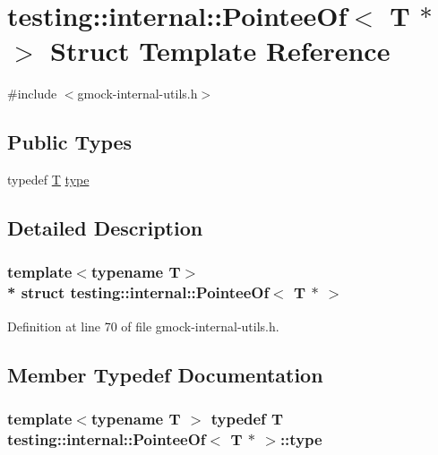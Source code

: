 \hypertarget{structtesting_1_1internal_1_1_pointee_of_3_01_t_01_5_01_4}{}\section{testing\+:\+:internal\+:\+:Pointee\+Of$<$ T $\ast$ $>$ Struct Template Reference}
\label{structtesting_1_1internal_1_1_pointee_of_3_01_t_01_5_01_4}


{\ttfamily \#include $<$gmock-\/internal-\/utils.\+h$>$}

\subsection*{Public Types}
\begin{DoxyCompactItemize}
\item 
typedef \hyperlink{functions__7_8js_adf1f3edb9115acb0a1e04209b7a9937b}{T} \hyperlink{structtesting_1_1internal_1_1_pointee_of_3_01_t_01_5_01_4_a91dde514cd3a8c07cedbe5336c36a55f}{type}
\end{DoxyCompactItemize}


\subsection{Detailed Description}
\subsubsection*{template$<$typename T$>$\\*
struct testing\+::internal\+::\+Pointee\+Of$<$ T $\ast$ $>$}



Definition at line 70 of file gmock-\/internal-\/utils.\+h.



\subsection{Member Typedef Documentation}
\subsubsection[{\texorpdfstring{type}{type}}]{\setlength{\rightskip}{0pt plus 5cm}template$<$typename T $>$ typedef {\bf T} {\bf testing\+::internal\+::\+Pointee\+Of}$<$ {\bf T} $\ast$ $>$\+::{\bf type}}\hypertarget{structtesting_1_1internal_1_1_pointee_of_3_01_t_01_5_01_4_a91dde514cd3a8c07cedbe5336c36a55f}{}\label{structtesting_1_1internal_1_1_pointee_of_3_01_t_01_5_01_4_a91dde514cd3a8c07cedbe5336c36a55f}


